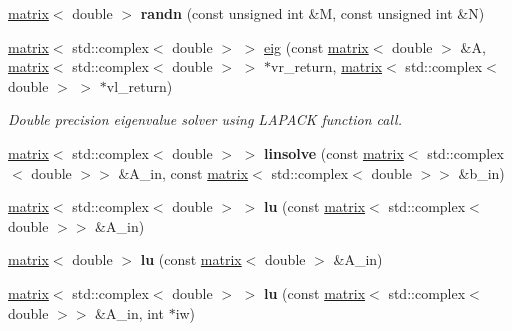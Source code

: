 \begin{DoxyCompactItemize}
\item 
\hypertarget{namespacekeycpp_a43bbf0f2c5e3c68a4e03abcce5aa63da}{\hyperlink{classkeycpp_1_1matrix}{matrix}$<$ double $>$ {\bfseries randn} (const unsigned int \&M, const unsigned int \&N)}\label{namespacekeycpp_a43bbf0f2c5e3c68a4e03abcce5aa63da}

\item 
\hyperlink{classkeycpp_1_1matrix}{matrix}$<$ std\-::complex$<$ double $>$ $>$ \hyperlink{namespacekeycpp_a11eb4ea6f5e22409e718cfd24de6c17a}{eig} (const \hyperlink{classkeycpp_1_1matrix}{matrix}$<$ double $>$ \&A, \hyperlink{classkeycpp_1_1matrix}{matrix}$<$ std\-::complex$<$ double $>$ $>$ $\ast$vr\-\_\-return, \hyperlink{classkeycpp_1_1matrix}{matrix}$<$ std\-::complex$<$ double $>$ $>$ $\ast$vl\-\_\-return)
\begin{DoxyCompactList}\small\item\em Double precision eigenvalue solver using L\-A\-P\-A\-C\-K function call. \end{DoxyCompactList}\item 
\hypertarget{namespacekeycpp_a2b6e970100e3e8a2b4061b104e92f2a2}{\hyperlink{classkeycpp_1_1matrix}{matrix}$<$ std\-::complex$<$ double $>$ $>$ {\bfseries linsolve} (const \hyperlink{classkeycpp_1_1matrix}{matrix}$<$ std\-::complex$<$ double $>$$>$ \&A\-\_\-in, const \hyperlink{classkeycpp_1_1matrix}{matrix}$<$ std\-::complex$<$ double $>$$>$ \&b\-\_\-in)}\label{namespacekeycpp_a2b6e970100e3e8a2b4061b104e92f2a2}

\item 
\hypertarget{namespacekeycpp_a5fa715d09dd31ec18be5cd455c216faa}{\hyperlink{classkeycpp_1_1matrix}{matrix}$<$ std\-::complex$<$ double $>$ $>$ {\bfseries lu} (const \hyperlink{classkeycpp_1_1matrix}{matrix}$<$ std\-::complex$<$ double $>$$>$ \&A\-\_\-in)}\label{namespacekeycpp_a5fa715d09dd31ec18be5cd455c216faa}

\item 
\hypertarget{namespacekeycpp_ac6e9ba154bce04912b775584590b4815}{\hyperlink{classkeycpp_1_1matrix}{matrix}$<$ double $>$ {\bfseries lu} (const \hyperlink{classkeycpp_1_1matrix}{matrix}$<$ double $>$ \&A\-\_\-in)}\label{namespacekeycpp_ac6e9ba154bce04912b775584590b4815}

\item 
\hypertarget{namespacekeycpp_a870bd38d5e2dbf79da93073b9d2d5d9e}{\hyperlink{classkeycpp_1_1matrix}{matrix}$<$ std\-::complex$<$ double $>$ $>$ {\bfseries lu} (const \hyperlink{classkeycpp_1_1matrix}{matrix}$<$ std\-::complex$<$ double $>$$>$ \&A\-\_\-in, int $\ast$iw)}\label{namespacekeycpp_a870bd38d5e2dbf79da93073b9d2d5d9e}


\end{DoxyCompactItemize}
